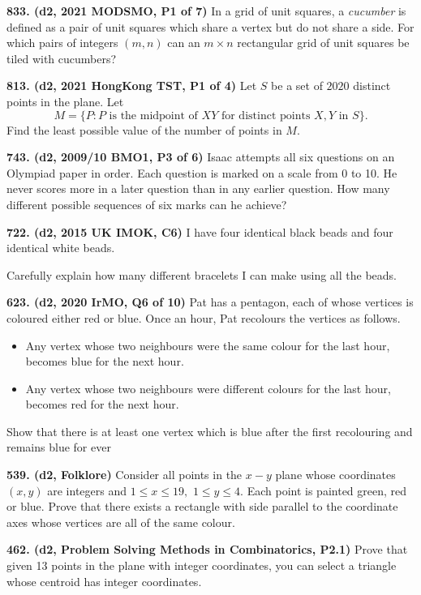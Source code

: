 \documentclass{article}
\begin{document}
        \textbf{833. (\color{red}d2\color{black}, 2021 MODSMO, P1 of 7)} In a grid of unit squares, a \emph{cucumber} is defined as a pair of unit squares which share a vertex but do not share a side. For which pairs of integers $(m, n)$ can an $m \times n$ rectangular grid of unit squares be tiled with cucumbers?

        \textbf{813. (\color{red}d2\color{black}, 2021 HongKong TST, P1 of 4)} Let $S$ be a set of $2020$ distinct points in the plane. Let
        \[M=\{P:P\text{ is the midpoint of }XY\text{ for distinct points }X,Y\text{ in }S\}.\]
        Find the least possible value of the number of points in $M$.

        \textbf{743. (\color{red}d2\color{black}, 2009/10 BMO1, P3 of 6)} Isaac attempts all six questions on an Olympiad paper in order. Each question is marked on a scale from 0 to 10. He never scores more in a later question than in any earlier question. How many different possible sequences of six marks can he achieve?

        \textbf{722. (\color{red}d2\color{black}, 2015 UK IMOK, C6)} I have four identical black beads and four identical white beads.

        Carefully explain how many different bracelets I can make using all the beads.

        \textbf{623. (\color{red}d2\color{black}, 2020 IrMO, Q6 of 10)} Pat has a pentagon, each of whose vertices is coloured either red or blue. Once an hour, Pat recolours the vertices as follows.
        \begin{itemize}
                \item Any vertex whose two neighbours were the same colour for the last hour, becomes blue for the next hour.
                \item Any vertex whose two neighbours were different colours for the last hour, becomes red for the next hour.
        \end{itemize}
        Show that there is at least one vertex which is blue after the first recolouring and remains blue for ever

        \textbf{539. (\color{red}d2\color{black}, Folklore)} Consider all points in the $x-y$ plane whose coordinates $(x, y)$ are integers and $1 \leq x \leq 19,$ $1 \leq y \leq 4 .$ Each point is painted green, red or blue. Prove that there exists a rectangle with side parallel to the coordinate axes whose vertices are all of the same colour.

        \textbf{462. (\color{red}d2\color{black}, Problem Solving Methods in Combinatorics, P2.1)} Prove that given 13 points in the plane with integer coordinates, you can select a triangle whose centroid has integer coordinates.
\end{document}
